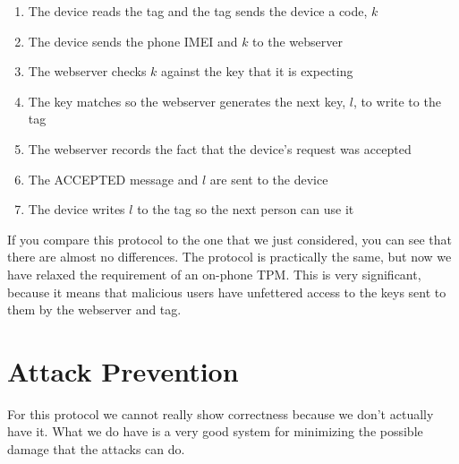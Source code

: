 \documentclass{sig-alternate}
\begin{document}
\begin{enumerate}
\item The device reads the tag and the tag sends the device a code, $k$
\item The device sends the phone IMEI and $k$ to the webserver
\item The webserver checks $k$ against the key that it is expecting
\item The key matches so the webserver generates the next key, $l$, to write to the tag
\item The webserver records the fact that the device's request was accepted
\item The ACCEPTED message and $l$ are sent to the device 
\item The device writes $l$ to the tag so the next person can use it
\end{enumerate}

If you compare this protocol to the one that we just considered, you
can see that there are almost no differences. The protocol is
practically the same, but now we have relaxed the requirement of an
on-phone TPM. This is very significant, because it means that
malicious users have unfettered access to the keys sent to them
by the webserver and tag. 

\section{Attack Prevention}
For this protocol we cannot really show correctness because we don't
actually have it. What we do have is a very good system for minimizing
the possible damage that the attacks can do. 
\end{document}
